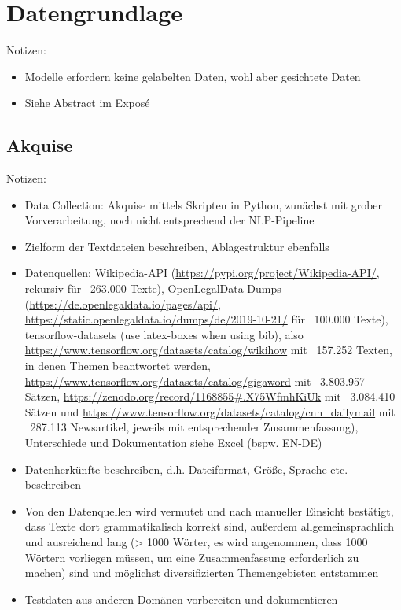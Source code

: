 \chapter{Datengrundlage}
\thispagestyle{fancy}
\label{chap:Datengrundlage}

Notizen:
\begin{itemize}
	\item Modelle erfordern keine gelabelten Daten, wohl aber gesichtete Daten	
	\item Siehe Abstract im Exposé
\end{itemize}


\section{Akquise}
Notizen:
\begin{itemize}
	\item Data Collection: Akquise mittels Skripten in Python, zunächst mit grober Vorverarbeitung, noch nicht entsprechend der NLP-Pipeline
	\item Zielform der Textdateien beschreiben, Ablagestruktur ebenfalls
	\item Datenquellen: Wikipedia-API (\url{https://pypi.org/project/Wikipedia-API/}, rekursiv für ~263.000 Texte), OpenLegalData-Dumps (\url{https://de.openlegaldata.io/pages/api/}, \url{https://static.openlegaldata.io/dumps/de/2019-10-21/} für ~100.000 Texte), tensorflow-datasets (use latex-boxes when using bib), also \url{https://www.tensorflow.org/datasets/catalog/wikihow} mit ~157.252 Texten, in denen Themen beantwortet werden, \url{https://www.tensorflow.org/datasets/catalog/gigaword} mit ~3.803.957 Sätzen, \url{https://zenodo.org/record/1168855#.X75WfmhKiUk} mit ~3.084.410 Sätzen und \url{https://www.tensorflow.org/datasets/catalog/cnn_dailymail} mit ~287.113 Newsartikel, jeweils mit entsprechender Zusammenfassung), Unterschiede und Dokumentation siehe Excel (bspw. EN-DE)
	\item Datenherkünfte beschreiben, d.h. Dateiformat, Größe, Sprache etc. beschreiben
	\item Von den Datenquellen wird vermutet und nach manueller Einsicht bestätigt, dass Texte dort grammatikalisch korrekt sind, außerdem allgemeinsprachlich und ausreichend lang (> 1000 Wörter, es wird angenommen, dass 1000 Wörtern vorliegen müssen, um eine Zusammenfassung erforderlich zu machen) sind und möglichst diversifizierten Themengebieten entstammen
	\item Testdaten aus anderen Domänen vorbereiten und dokumentieren

\end{itemize}
